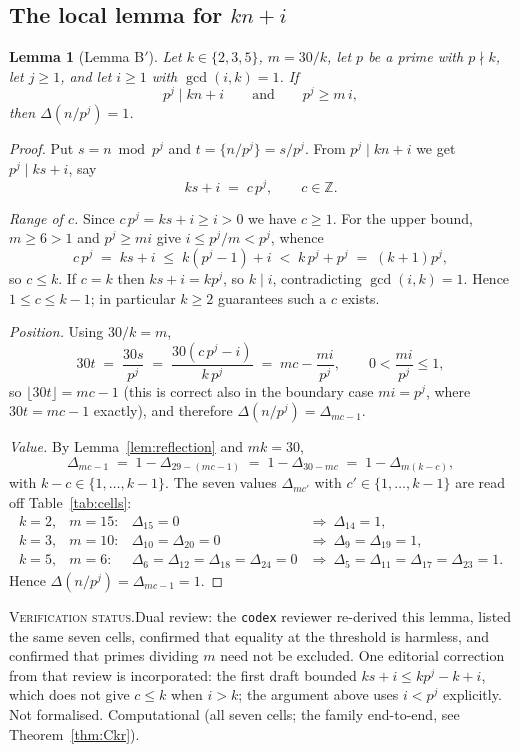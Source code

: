 \documentclass[11pt]{article}
\theoremstyle{plain}
\newtheorem{lemma}[theorem]{Lemma}
\theoremstyle{definition}
\theoremstyle{remark}
\numberwithin{equation}{section}
\newcommand{\Z}{\mathbb{Z}}
\newcommand{\vstatus}[1]{%
  \par\vspace{3pt}\noindent
  {\small\textsc{Verification status.}\enspace #1}\par\vspace{3pt}}
\begin{document}
\subsection{The local lemma for $kn+i$}

\begin{lemma}[Lemma B$'$]
\label{lem:Bprime}
Let $k \in \{2,3,5\}$, $m = 30/k$, let $p$ be a prime with $p \nmid k$, let $j \ge 1$, and let
$i \ge 1$ with $\gcd(i,k)=1$. If
\[
  p^j \mid kn + i \qquad\text{and}\qquad p^j \ge m\,i,
\]
then $\Delta(n/p^j) = 1$.
\end{lemma}

\begin{proof}
Put $s = n \bmod p^j$ and $t = \{n/p^j\} = s/p^j$. From $p^j \mid kn+i$ we get $p^j \mid ks+i$,
say
\[
  k s + i \;=\; c\,p^j, \qquad c \in \Z .
\]

\emph{Range of $c$.} Since $c\,p^j = ks + i \ge i > 0$ we have $c \ge 1$. For the upper bound,
$m \ge 6 > 1$ and $p^j \ge mi$ give $i \le p^j/m < p^j$, whence
\[
  c\,p^j \;=\; ks + i \;\le\; k(p^j - 1) + i \;<\; k\,p^j + p^j \;=\; (k+1)p^j ,
\]
so $c \le k$. If $c = k$ then $ks+i = k p^j$, so $k \mid i$, contradicting $\gcd(i,k)=1$. Hence
$1 \le c \le k-1$; in particular $k \ge 2$ guarantees such a $c$ exists.

\emph{Position.} Using $30/k = m$,
\[
  30t \;=\; \frac{30 s}{p^j} \;=\; \frac{30(c\,p^j - i)}{k\,p^j} \;=\; mc - \frac{mi}{p^j},
  \qquad 0 < \frac{mi}{p^j} \le 1 ,
\]
so $\lfloor 30t\rfloor = mc-1$ (this is correct also in the boundary case $mi = p^j$, where
$30t = mc-1$ exactly), and therefore $\Delta(n/p^j) = \Delta_{mc-1}$.

\emph{Value.} By Lemma~\ref{lem:reflection} and $mk = 30$,
\[
  \Delta_{mc-1} \;=\; 1 - \Delta_{29-(mc-1)} \;=\; 1 - \Delta_{30-mc} \;=\; 1 - \Delta_{m(k-c)},
\]
with $k - c \in \{1,\dots,k-1\}$. The seven values $\Delta_{mc'}$ with $c' \in \{1,\dots,k-1\}$
are read off Table~\ref{tab:cells}:
\[
  \begin{array}{llll}
  k=2, & m=15: & \Delta_{15}=0 & \Longrightarrow\ \Delta_{14}=1,\\
  k=3, & m=10: & \Delta_{10}=\Delta_{20}=0 & \Longrightarrow\ \Delta_{9}=\Delta_{19}=1,\\
  k=5, & m=6:  & \Delta_{6}=\Delta_{12}=\Delta_{18}=\Delta_{24}=0
    & \Longrightarrow\ \Delta_{5}=\Delta_{11}=\Delta_{17}=\Delta_{23}=1 .
  \end{array}
\]
Hence $\Delta(n/p^j) = \Delta_{mc-1} = 1$.
\end{proof}
\vstatus{Dual review: the \texttt{codex} reviewer re-derived this lemma, listed the same seven
cells, confirmed that equality at the threshold is harmless, and confirmed that primes dividing
$m$ need not be excluded. One editorial correction from that review is incorporated: the first
draft bounded $ks+i \le k p^j - k + i$, which does not give $c \le k$ when $i > k$; the argument
above uses $i < p^j$ explicitly. Not formalised. Computational (all seven cells; the family
end-to-end, see Theorem~\ref{thm:Ckr}).}
\end{document}
